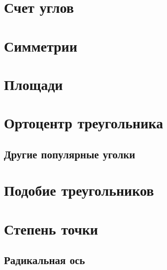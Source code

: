 \documentclass[twoside]{article}
\begin{document}
\pagestyle{empty}

% 


\newpage

\tableofcontents
\newpage

\setcounter{page}{1}
\pagestyle{fancy}


\section{Счет углов}


% 

\section{Симметрии}

\section{Площади}


\section{Ортоцентр треугольника}


\subsection{Другие популярные уголки}


\section{Подобие треугольников} 



\section{Степень точки}


\subsection{Радикальная ось}

\end{document}

